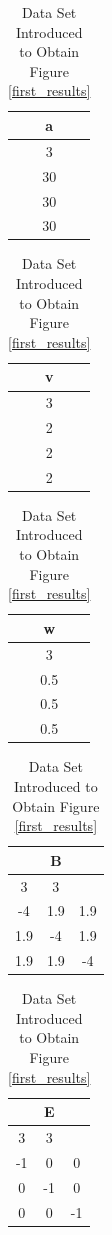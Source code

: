 \documentclass[12pt]{article}
\begin{document}
\begin{table}
\begin{center}
\begin{minipage}{1in}
\begin{tabular}{c}
a\\
\hline
\hline
3\\
\hline
30\\
30\\
30\\
\end{tabular}
\end{minipage}
\begin{minipage}{1in}
\begin{tabular}{c}
v\\
\hline
\hline
3\\
\hline
2\\
2\\
2\\
\end{tabular}
\end{minipage}
\begin{minipage}{1in}
\begin{tabular}{c}
w\\
\hline
\hline
3\\
\hline
0.5\\
0.5\\
0.5\\
\end{tabular}
\end{minipage}
\begin{minipage}{1.5in}
\begin{tabular}{ccc}
&B&\\
\hline
\hline
3&3&\\
\hline
-4&1.9&1.9\\
1.9&-4&1.9\\
1.9&1.9&-4\\
\end{tabular}
\end{minipage}
\begin{minipage}{1in}
\begin{tabular}{ccc}
&E&\\
\hline
\hline
3&3&\\
\hline
-1&0&0\\
0&-1&0\\
0&0&-1\\
\end{tabular}
\end{minipage}
\caption{\label{tab:input}Data Set Introduced to Obtain Figure \ref{first_results}}
\end{center}
\end{table}
\end{document}
